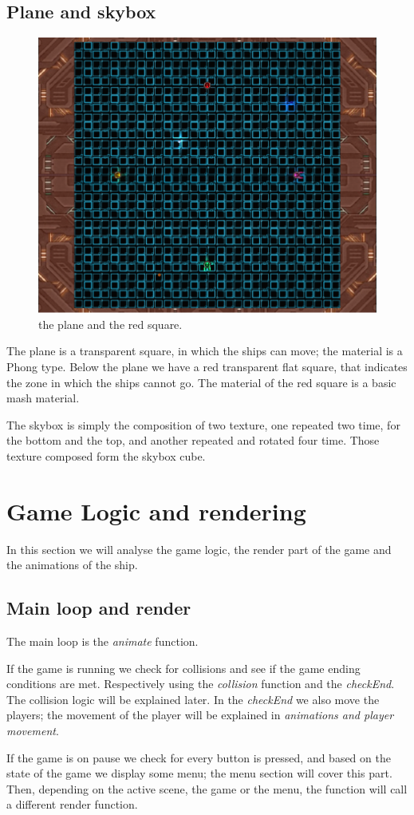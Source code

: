 \documentclass[11pt]{article}
\begin{document}
\subsection{Plane and skybox}

\begin{figure}
	\centering
	\includegraphics[width=0.4\linewidth]{plane}
	\caption{the plane and the red square.}
\end{figure}
The plane is a transparent square, in which the ships can move; the material is a Phong type. Below the plane we have a red transparent flat square, that indicates the zone in which the ships cannot go. The material of the red square is a basic mash material.

The skybox is simply the composition of two texture, one repeated two time, for the bottom and the top, and another repeated and rotated four time. Those texture composed form the skybox cube.

\newpage
\section{Game Logic and rendering}
In this section we will analyse the game logic, the render part of the game and the animations of the ship. 
\subsection{Main loop and render}

The main loop is the \textit{animate} function. 

If the game is running we check for collisions and see if the game ending conditions are met. Respectively using the \textit{collision} function and the \textit{checkEnd}. The collision logic will be explained later. In the \textit{checkEnd} we also move the players; the movement of the player will be explained in \textit{animations and player movement}.

If the game is on pause we check for every button is pressed, and based on the state of the game we display some menu; the menu section will cover this part. Then, depending on the active scene, the game or the menu, the function will call a different render function. 
\end{document}
